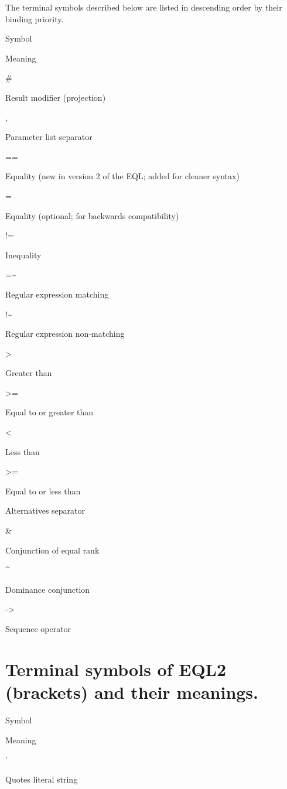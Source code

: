\documentclass[
]{book}
\begin{document}
The terminal symbols described below are listed in descending order by their binding priority.

Symbol

Meaning

\#

Result modifier (projection)

,

Parameter list separator

==

Equality (new in version 2 of the EQL; added for cleaner syntax)

=

Equality (optional; for backwards compatibility)

!=

Inequality

=\textasciitilde{}

Regular expression matching

!\textasciitilde{}

Regular expression non-matching

\textgreater{}

Greater than

\textgreater=

Equal to or greater than

\textless{}

Less than

\textgreater=

Equal to or less than

\textbar{}

Alternatives separator

\&

Conjunction of equal rank

\^{}

Dominance conjunction

-\textgreater{}

Sequence operator

\hypertarget{terminal-symbols-of-eql2-brackets-and-their-meanings.}{%
\section{Terminal symbols of EQL2 (brackets) and their meanings.}\label{terminal-symbols-of-eql2-brackets-and-their-meanings.}}

Symbol

Meaning

'

Quotes literal string
\end{document}
